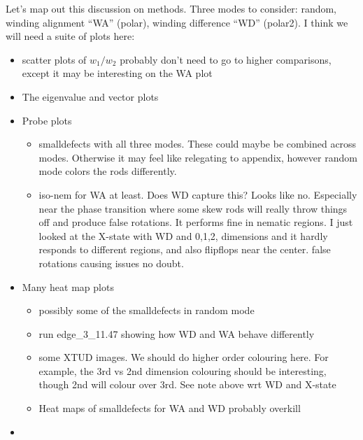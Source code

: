 Let's map out this discussion on methods.
Three modes to consider: random, winding alignment ``WA'' (polar), winding difference ``WD'' (polar2).
I think we will need a suite of plots here: 
\begin{itemize}
	\item scatter plots of $w_1/w_2$ probably don't need to go to higher comparisons, except it may be interesting on the WA plot
	\item The eigenvalue and vector plots
	\item Probe plots
	\begin{itemize}
		\item smalldefects with all three modes. These could maybe be combined across modes. Otherwise it may feel like relegating to appendix, however random mode colors the rods differently.
		\item iso-nem for WA at least. Does WD capture this? Looks like no. Especially near the phase transition where some skew rods will really throw things off and produce false rotations. It performs fine in nematic regions.
		I just looked at the X-state with WD and 0,1,2, dimensions and it hardly responds to different regions, and also flipflops near the center. false rotations causing issues no doubt.
	\end{itemize}
	\item Many heat map plots
	\begin{itemize}
		\item possibly some of the smalldefects in random mode
		\item run edge\_3\_11.47 showing how WD and WA behave differently
		\item some XTUD images. We should do higher order colouring here. For example, the 3rd vs 2nd dimension colouring should be interesting, though 2nd will colour over 3rd. See note above wrt WD and X-state
		\item Heat maps of smalldefects for WA and WD probably overkill
	\end{itemize}
	\item 
\end{itemize}


